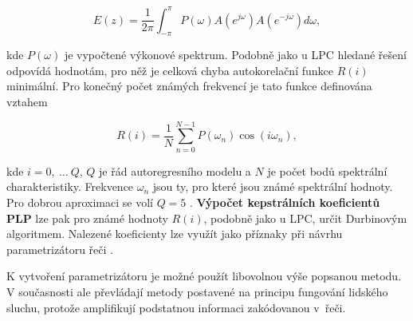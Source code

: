 \begin{equation}
  E\left(z\right) = \frac{1}{2\pi} \int_{-\pi}^{\pi} P\left(\omega\right) A\left(e^{j\omega}\right) A\left(e^{-j\omega}\right)d\omega,
  \label{eq:asr:plp:error:final}
\end{equation}

\noindent kde $P\left(\omega\right)$ je vypočtené výkonové spektrum. Podobně jako u LPC hledané řešení odpovídá hodnotám, pro něž je celková chyba autokorelační funkce $R\left(i\right)$ minimální. Pro konečný počet známých frekvencí je tato funkce definována vztahem

\begin{equation}
  R\left(i\right) = \frac{1}{N} \sum_{n=0}^{N-1} P\left(\omega_n\right) \cos\left(i\omega_n\right),
  \label{eq:asr:plp:error:solution}
\end{equation}

\noindent kde $i = 0,\ \dots\ Q$, $Q$ je řád autoregresního modelu a $N$ je počet bodů spektrální charakteristiky. Frekvence $\omega_n$ jsou ty, pro které jsou známé spektrální hodnoty. Pro dobrou aproximaci se volí $Q = 5$ \cite{Benesty2007}. \textbf{Výpočet kepstrálních koeficientů PLP} lze pak pro známé hodnoty $R\left(i\right)$, podobně jako u LPC, určit Durbinovým algoritmem. Nalezené koeficienty lze využít jako příznaky při návrhu parametrizátoru řeči
\cite{Holmes2001}.

K vytvoření parametrizátoru je možné použít libovolnou výše popsanou metodu. %
V současnosti ale převládají metody postavené na principu fungování lidského sluchu, protože amplifikují podstatnou informaci zakódovanou v~řeči.
